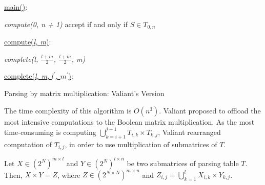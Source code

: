 \begin{algorithm}[t]
\SetAlgoNoLine
{}
\underline{main()}{:}{

 \textit{compute(0, n + 1)\;}
 accept if and only if $S \in T_{0, n}$
 \linebreak
 }

\underline{compute(\textit{l, m})}{:}{

 \textit{complete(l, $\frac{l+m}{2}$, $\frac{l+m}{2}$, m)}
 \linebreak
 }

\underline{complete(\textit{l, m}, $l^\prime$, $m^\prime$)}{:}{

 }
\caption{Parsing by matrix multiplication: Valiant's Version}
\label{algo:valiant}
\end{algorithm}

The time complexity of this algorithm is $O(n^3)$. Valiant proposed to offload the most intensive computations to the Boolean matrix multiplication. As the most time-consuming is computing $\bigcup\limits_{k = i + 1}^{j - 1} T_{i, k} \times T_{k, j}$, Valiant rearranged computation of $T_{i, j}$, in order to use multiplication of submatrices of $T$.

\begin{defn}\label{def:defn4} Let $X \in (2^N)^{m \times l}$ and $Y \in (2^N)^{l \times n}$ be two submatrices of parsing table $T$. Then, $X \times Y = Z$, where $Z \in (2^{N \times N})^{m \times n}$ and $Z_{i, j} = \bigcup\limits_{k = 1}^{l} X_{i, k} \times Y_{k, j}$.
\end{defn}

